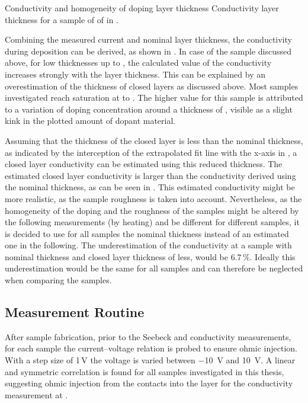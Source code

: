 {Conductivity and homogeneity of doping \vs layer thickness}
{Conductivity \vs layer thickness for a sample of \C[0.022] of \CrPd in \CS.}

Combining the measured current and nominal layer thickness, the conductivity during deposition can be derived, as shown in . In case of the sample discussed above, for low thicknesses up to , the calculated value of the conductivity increases strongly with the layer thickness. This can be explained by an overestimation of the thickness of closed layers as discussed above. Most samples investigated reach saturation at  to . The higher value for this sample is attributed to a variation of doping concentration around a thickness of , visible as a slight kink in the plotted amount of dopant material.

Assuming that the thickness of the closed layer is  less than the nominal thickness, as indicated by the interception of the extrapolated fit line with the x-axis in , a closed layer conductivity can be estimated using this reduced thickness. The estimated closed layer conductivity is larger than the conductivity derived using the nominal thickness, as can be seen in . This estimated conductivity might be more realistic, as the sample roughness is taken into account. Nevertheless, as the homogeneity of the doping and the
roughness of the samples might be altered by the following measurements (\eg by heating) and be different for different samples, it is decided to use for all samples the nominal thickness instead of an estimated one in the following.
The underestimation of the conductivity at a sample with  nominal thickness and closed layer thickness of  less, would be 6.7\,\%. Ideally this underestimation would be the same for all samples and can therefore be neglected when comparing the samples.

\subsection{Measurement Routine}\label{sec:ExpMeasRoutine}
After sample fabrication, prior to the Seebeck and conductivity measurements, for each sample the current--voltage relation is probed to ensure ohmic injection. With a step size of 1\,V the voltage is varied between \SI{-10}{\volt} and \SI{+10}{\volt}. A linear and symmetric correlation is found for all samples investigated in this thesis, suggesting ohmic injection from the contacts into the layer for the conductivity measurement at \V[1].

